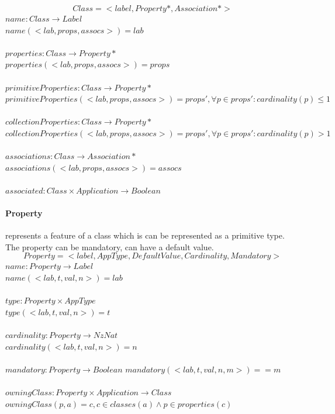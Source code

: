 \documentclass[11pt]{article}
\begin{document}
$$Class = < label, Property*, Association* >$$
$name : Class \rightarrow Label$ \\
$name(< lab, props, assocs  >) = lab$ \\ \\
$properties : Class \rightarrow Property*$ \\
$properties(< lab, props, assocs  >) = props $\\ \\
$primitiveProperties : Class \rightarrow Property*$ \\
$primitiveProperties(< lab, props, assocs  >) = props', \forall p \in props' : cardinality(p) \leq 1 $\\ \\
$collectionProperties : Class \rightarrow Property*$ \\
$collectionProperties(< lab, props, assocs  >) = props', \forall p \in props' : cardinality(p) > 1 $\\ \\
$associations : Class \rightarrow Association*$ \\
$associations(< lab, props, assocs  >) = assocs $ \\ \\
$associated :  Class \times Application \rightarrow Boolean $

\paragraph{Property} represents a feature of  a class which is can be represented as a primitive type. The property can be mandatory, can have a default value.
$$
Property = < label, AppType, DefaultValue, Cardinality, Mandatory >
$$
$name : Property \rightarrow Label$ \\
$name(< lab, t, val, n  >) = lab$ \\ \\
$type : Property \times AppType$ \\
$type(< lab, t, val, n  >) = t$ \\ \\
$cardinality : Property \rightarrow NzNat$ \\
$cardinality(< lab, t, val, n  >) = n$ \\ \\
$mandatory : Property \rightarrow Boolean $
$mandatory(<lab, t, val, n, m >) = = m $ \\ \\
$owningClass : Property \times Application \rightarrow Class $ \\
$owningClass(p, a) = c, c \in classes(a) \wedge p \in properties(c) $
\end{document}
